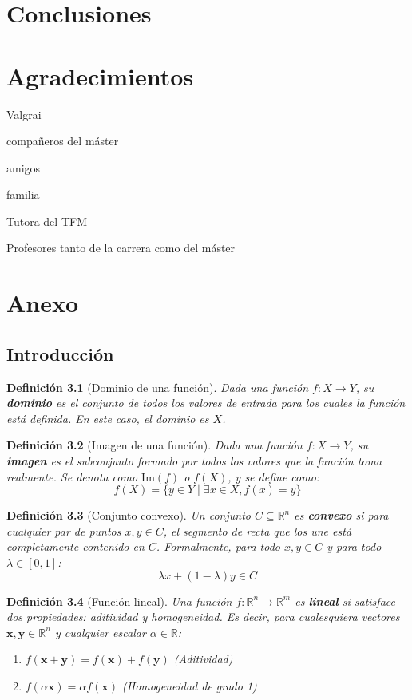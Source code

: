 \documentclass[12pt,a4paper]{book}
\newtheorem{defi}{Definición}[section]
\begin{document}
\chapter{Conclusiones}


\chapter{Agradecimientos}
Valgrai

compañeros del máster

amigos

familia

Tutora del TFM

Profesores tanto de la carrera como del máster 

\chapter{Anexo}
\section{Introducción}
\begin{defi}[Dominio de una función]
\label{def:dominio}
Dada una función $f: X \to Y$, su \textbf{dominio} es el conjunto de todos los valores de entrada para los cuales la función está definida. En este caso, el dominio es $X$.
\end{defi}

\begin{defi}[Imagen de una función]
Dada una función $f: X \to Y$, su \textbf{imagen} es el subconjunto formado por todos los valores que la función toma realmente. Se denota como $\text{Im}(f)$ o $f(X)$, y se define como:
$$ f(X) = \{y \in Y \mid \exists x \in X, f(x) = y \} $$
\end{defi}

\begin{defi}[Conjunto convexo]
\label{def:convexo}
Un conjunto $C \subseteq \mathbb{R}^n$ es \textbf{convexo} si para cualquier par de puntos $x, y \in C$, el segmento de recta que los une está completamente contenido en $C$. Formalmente, para todo $x, y \in C$ y para todo $\lambda \in [0, 1]$:
$$ \lambda x + (1-\lambda)y \in C $$
\end{defi}

\begin{defi}[Función lineal]
\label{def:f_lineal}
Una función $f: \mathbb{R}^n \to \mathbb{R}^m$ es \textbf{lineal} si satisface dos propiedades: aditividad y homogeneidad. Es decir, para cualesquiera vectores $\mathbf{x}, \mathbf{y} \in \mathbb{R}^n$ y cualquier escalar $\alpha \in \mathbb{R}$:
\begin{enumerate}
    \item $f(\mathbf{x}+\mathbf{y}) = f(\mathbf{x}) + f(\mathbf{y})$ (Aditividad)
    \item $f(\alpha \mathbf{x}) = \alpha f(\mathbf{x})$ (Homogeneidad de grado 1)
\end{enumerate}
\end{defi}
\end{document}
